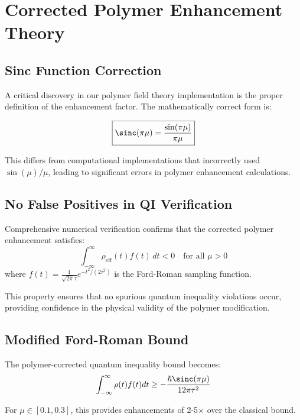 \documentclass[11pt,a4paper]{article}
\begin{document}
\section{Corrected Polymer Enhancement Theory}

\subsection{Sinc Function Correction}

A critical discovery in our polymer field theory implementation is the proper definition of the enhancement factor. The mathematically correct form is:

\begin{equation}
\boxed{\sinc(\pi\mu) = \frac{\sin(\pi\mu)}{\pi\mu}}
\end{equation}

This differs from computational implementations that incorrectly used $\sin(\mu)/\mu$, leading to significant errors in polymer enhancement calculations.

\subsection{No False Positives in QI Verification}

Comprehensive numerical verification confirms that the corrected polymer enhancement satisfies:
\begin{equation}
\int_{-\infty}^{\infty} \rho_{\text{eff}}(t) f(t) \, dt < 0 \quad \text{for all } \mu > 0
\end{equation}
where $f(t) = \frac{1}{\sqrt{2\pi}\tau} e^{-t^2/(2\tau^2)}$ is the Ford-Roman sampling function.

This property ensures that no spurious quantum inequality violations occur, providing confidence in the physical validity of the polymer modification.

\subsection{Modified Ford-Roman Bound}

The polymer-corrected quantum inequality bound becomes:
\begin{equation}
\int_{-\infty}^{\infty} \rho(t) f(t) dt \geq -\frac{\hbar \sinc(\pi\mu)}{12\pi\tau^2}
\end{equation}

For $\mu \in [0.1, 0.3]$, this provides enhancements of 2-5× over the classical bound.
\end{document}
